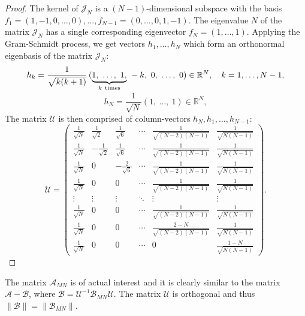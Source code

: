 \begin{proof}
    The kernel of \( \mathcal{J}_N \)
        is a \( (N-1) \)-dimensional subspace
        with the basis
        \( f_1 = {\left(1,-1,0,\ldots,0\right)}, \ldots,
           f_{N-1} = {\left(0,\ldots,0,1,-1\right)} \).
    The eigenvalue \( N \) of the matrix \( \mathcal{J}_N \) 
        has a single corresponding eigenvector
        \( f_N = {\left(1,\ldots,1\right)} \).
    Applying the Gram-Schmidt process,
        we get vectors \( h_1, \ldots, h_N \)
        which form an orthonormal eigenbasis of the matrix \( \mathcal{J}_N \):
    \[
        h_k = \frac{1}{\sqrt{k(k+1)}}
            \left(\smash{\underbrace{1,~\ldots,~1,}_{k\ \text{times}}}~-k,~0,~\ldots,~0\right)
            \in \mathbb{R}^N, \quad k={1, \ldots, N-1}, \]
    \[
        h_N = \frac{1}{\sqrt{N}}{\left(1,~\ldots,~1\right)} \in \mathbb{R}^N, \]
    The matrix \( \mathcal{U} \) is then
    comprised of column-vectors \( h_N, h_1, \ldots, h_{N-1} \):
    \[ \mathcal{U} =
    \begin{pmatrix}
        \frac{1}{\sqrt N} &  \frac{1}{\sqrt2} &  \frac{1}{\sqrt{6}} & \cdots & \frac{1}{\sqrt{(N-2)(N-1)}} & \frac{1}{\sqrt{N(N-1)}} \\
        \frac{1}{\sqrt N} & -\frac{1}{\sqrt2} &  \frac{1}{\sqrt{6}} & \cdots & \frac{1}{\sqrt{(N-2)(N-1)}} & \frac{1}{\sqrt{N(N-1)}} \\
        \frac{1}{\sqrt N} & 0                 & -\frac{2}{\sqrt{6}} & \cdots & \frac{1}{\sqrt{(N-2)(N-1)}} & \frac{1}{\sqrt{N(N-1)}} \\
        \frac{1}{\sqrt N} & 0                 &  0                  & \cdots & \frac{1}{\sqrt{(N-2)(N-1)}} & \frac{1}{\sqrt{N(N-1)}} \\
        \vdots            & \vdots            &  \vdots             & \ddots & \vdots                      & \vdots   \\
        \frac{1}{\sqrt N} & 0                 &  0                  & \cdots & \frac{1}{\sqrt{(N-2)(N-1)}} & \frac{1}{\sqrt{N(N-1)}} \\
        \frac{1}{\sqrt N} & 0                 &  0                  & \cdots & \frac{2-N}{\sqrt{(N-2)(N-1)}} & \frac{1}{\sqrt{N(N-1)}} \\
        \frac{1}{\sqrt N} & 0                 &  0                  & \cdots & 0                  & \frac{1-N}{\sqrt{N(N-1)}}
    \end{pmatrix}.\]
\end{proof}

The matrix \( \mathcal{A}_{MN} \) is of actual interest
    and it is clearly similar to the matrix
    \( \mathcal{A} - \mathcal{B} \),
    where \( \mathcal{B} = \mathcal{U}^{-1} \mathscr{B}_{MN} \mathcal{U} \).
The matrix \( \mathcal{U} \) is orthogonal and thus \( \|\mathcal{B}\| = \|\mathscr{B}_{MN}\| \).

